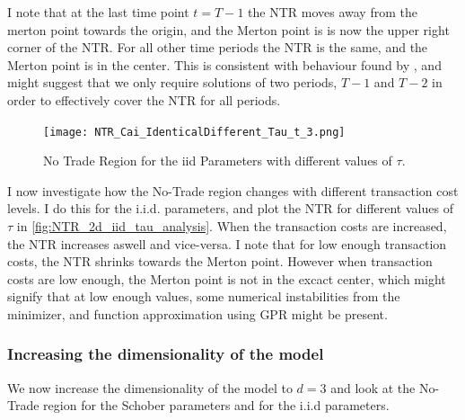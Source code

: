 \documentclass[11pt]{article}
\begin{document}
I note that at the last time point $t = T-1$ the \ac{NTR} moves away from the merton point towards the origin, and the Merton point is is
now the upper right corner of the \ac{NTR}. For all other time periods the \ac{NTR} is the same, and the Merton point is in the center.
This is consistent with behaviour found by \autocite{CaiJuddXu2013}, and might suggest that we only require solutions of two periods, $T-1$ and $T-2$ in order to
effectively cover the \ac{NTR} for all periods.

\begin{figure}[!ht]
    \centering
    \texttt{[image: NTR\_Cai\_IdenticalDifferent\_Tau\_t\_3.png]}
    \caption{No Trade Region for the iid Parameters with different values of $\tau$.}
    \label{fig:NTR_2d_iid_tau_analysis}
\end{figure}
I now investigate how the No-Trade region changes with different transaction cost levels.
I do this for the i.i.d. parameters, and plot the \ac{NTR} for different values of $\tau$ in \autoref{fig:NTR_2d_iid_tau_analysis}.
When the transaction costs are increased, the \ac{NTR} increases aswell and vice-versa. 
I note that for low enough transaction costs, the \ac{NTR} shrinks towards the Merton point.
However when transaction costs are low enough, the Merton point is not in the excact center, which might signify that at low enough values, some numerical instabilities from the
minimizer, and function approximation using \ac{GPR} might be present.

\subsubsection{Increasing the dimensionality of the model} \label{Subsubsection: IncreasingDimensionality}
We now increase the dimensionality of the model to $d = 3$ and look at the No-Trade region for the Schober parameters and for the i.i.d parameters.
\end{document}
